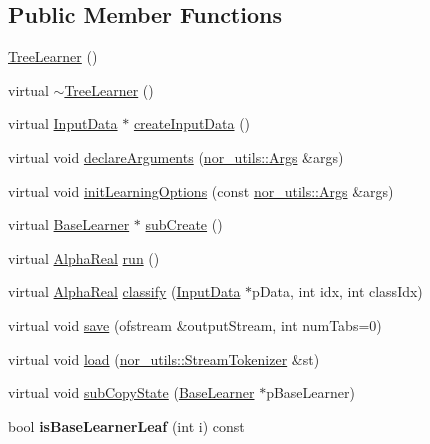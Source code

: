 \subsection*{Public Member Functions}
\begin{DoxyCompactItemize}
\item 
\hyperlink{classMultiBoost_1_1TreeLearner_add22f7f69e844d8bfc1936e1226eefdd}{TreeLearner} ()
\item 
virtual \hyperlink{classMultiBoost_1_1TreeLearner_a370113a55a0121f8964d1885ea764a0a}{$\sim$TreeLearner} ()
\item 
virtual \hyperlink{classMultiBoost_1_1InputData}{InputData} $\ast$ \hyperlink{classMultiBoost_1_1TreeLearner_a336b8003794abb6997586f6e3d5bc4de}{createInputData} ()
\item 
virtual void \hyperlink{classMultiBoost_1_1TreeLearner_a1cbd38140dac10a3ff10300ccdd10f58}{declareArguments} (\hyperlink{classnor__utils_1_1Args}{nor\_\-utils::Args} \&args)
\item 
virtual void \hyperlink{classMultiBoost_1_1TreeLearner_aaab5381d0cb6c70832319614ea51f782}{initLearningOptions} (const \hyperlink{classnor__utils_1_1Args}{nor\_\-utils::Args} \&args)
\item 
virtual \hyperlink{classMultiBoost_1_1BaseLearner}{BaseLearner} $\ast$ \hyperlink{classMultiBoost_1_1TreeLearner_ad3d4d99f32e53fbe5f2469c7498656c5}{subCreate} ()
\item 
virtual \hyperlink{Defaults_8h_a80184c4fd10ab70a1a17c5f97dcd1563}{AlphaReal} \hyperlink{classMultiBoost_1_1TreeLearner_a414a95428a1404296fd63429cdc83184}{run} ()
\item 
virtual \hyperlink{Defaults_8h_a80184c4fd10ab70a1a17c5f97dcd1563}{AlphaReal} \hyperlink{classMultiBoost_1_1TreeLearner_ae8dc3365720bb37dc29b5c5c67d4d002}{classify} (\hyperlink{classMultiBoost_1_1InputData}{InputData} $\ast$pData, int idx, int classIdx)
\item 
virtual void \hyperlink{classMultiBoost_1_1TreeLearner_accb9bf275b24b274f346b34bd7d18b15}{save} (ofstream \&outputStream, int numTabs=0)
\item 
virtual void \hyperlink{classMultiBoost_1_1TreeLearner_a8bea8a77c5695f3198d2fd1f7f51a92e}{load} (\hyperlink{classnor__utils_1_1StreamTokenizer}{nor\_\-utils::StreamTokenizer} \&st)
\item 
virtual void \hyperlink{classMultiBoost_1_1TreeLearner_a3d53f42b507438279ac31161a600e9fd}{subCopyState} (\hyperlink{classMultiBoost_1_1BaseLearner}{BaseLearner} $\ast$pBaseLearner)
\item 
\hypertarget{classMultiBoost_1_1TreeLearner_a1c6c8a32cb9411cd1e5898188098b128}{
bool {\bfseries isBaseLearnerLeaf} (int i) const }
\label{classMultiBoost_1_1TreeLearner_a1c6c8a32cb9411cd1e5898188098b128}

\end{DoxyCompactItemize}

